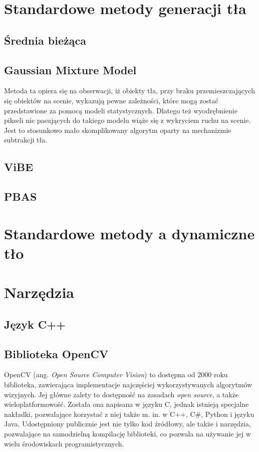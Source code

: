 \section{Standardowe metody generacji tła}
\subsection{Średnia bieżąca}
\cite{collins2003mean}
\subsection{Gaussian Mixture Model}
\label{sec:GMM}
Metoda ta \cite{zivkovic2004improved} opiera się na obserwacji, iż obiekty tła, przy braku przemieszczających się obiektów na scenie, wykazują pewne zależności, które mogą zostać przedstawione za pomocą modeli statystycznych. Dlatego też wyodrębnienie pikseli nie pasujących do takiego modelu wiąże się z wykryciem ruchu na scenie. Jest to stosunkowo mało skomplikowany algorytm oparty na mechanizmie subtrakcji tła.

\subsection{ViBE}
\cite{barnich2011vibe}
\subsection{PBAS}
\cite{hofmann2012background}
\section{Standardowe metody a dynamiczne tło}
\section{Narzędzia}
\subsection{Język C++}
\subsection{Biblioteka OpenCV}

OpenCV (ang. \textit{Open Source Computer Vision}) to dostępna od 2000 roku biblioteka, zawierająca implementacje najczęściej wykorzystywanych algorytmów wizyjnych. Jej główne zalety to dostępność na zasadach \textit{open source}, a także wieloplatformowość. Została ona napisana w języku C, jednak istnieją specjalne nakładki, pozwalające korzystać z niej także m. in. w C++, C\#, Python i języku Java. Udostępniony publicznie jest nie tylko kod źródłowy, ale także i narzędzia, pozwalające na samodzielną kompilację biblioteki, co pozwala na używanie jej w wielu środowiskach programistycznych.
